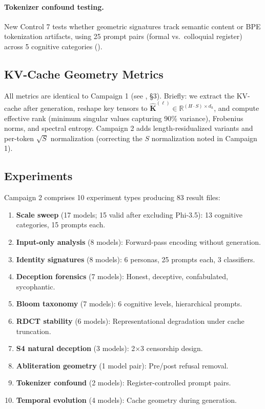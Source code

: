 \documentclass[11pt,a4paper]{article}
\begin{document}
\paragraph{Tokenizer confound testing.} New Control 7 tests whether geometric signatures track semantic content or BPE tokenization artifacts, using 25 prompt pairs (formal vs.\ colloquial register) across 5 cognitive categories ().

\subsection{KV-Cache Geometry Metrics}

All metrics are identical to Campaign 1 (see \citealt{lyra2026campaign1}, \S3). Briefly: we extract the KV-cache after generation, reshape key tensors to $\hat{\mathbf{K}}^{(\ell)} \in \mathbb{R}^{(H \cdot S) \times d_h}$, and compute effective rank (minimum singular values capturing 90\% variance), Frobenius norms, and spectral entropy. Campaign 2 adds length-residualized variants and per-token $\sqrt{S}$ normalization (correcting the $S$ normalization noted in Campaign 1).

\subsection{Experiments}

Campaign 2 comprises 10 experiment types producing 83 result files:

\begin{enumerate}[leftmargin=*]
    \item \textbf{Scale sweep} (17 models; 15 valid after excluding Phi-3.5): 13 cognitive categories, 15 prompts each.
    \item \textbf{Input-only analysis} (8 models): Forward-pass encoding without generation.
    \item \textbf{Identity signatures} (8 models): 6 personas, 25 prompts each, 3 classifiers.
    \item \textbf{Deception forensics} (7 models): Honest, deceptive, confabulated, sycophantic.
    \item \textbf{Bloom taxonomy} (7 models): 6 cognitive levels, hierarchical prompts.
    \item \textbf{RDCT stability} (6 models): Representational degradation under cache truncation.
    \item \textbf{S4 natural deception} (3 models): 2$\times$3 censorship design.
    \item \textbf{Abliteration geometry} (1 model pair): Pre/post refusal removal.
    \item \textbf{Tokenizer confound} (2 models): Register-controlled prompt pairs.
    \item \textbf{Temporal evolution} (4 models): Cache geometry during generation.
\end{enumerate}
\end{document}
